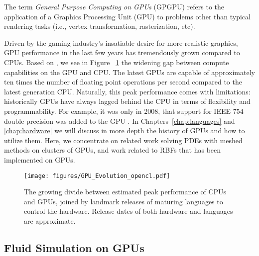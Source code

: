 
The term \emph{General Purpose Computing on GPUs} (GPGPU) refers to the application of a Graphics Processing Unit (GPU) 
to problems other than typical rendering tasks (i.e., vertex transformation, rasterization, etc). 

Driven by the gaming industry's insatiable desire for more realistic graphics, GPU performance in the last few years has 
tremendously grown compared to CPUs.
Based on \cite{Jansen:2007, CudaGuide:2008, GTX280:2008, Core2Extreme:2008, FermiPrice:2009}, we see in Figure~
\ref{fig:gpuevolution} the widening gap between compute capabilities on 
the GPU and CPU. The latest GPUs are capable of approximately ten times the number of 
floating point operations per second compared to the latest generation CPU. Naturally, this peak performance comes with limitations: historically GPUs have always lagged behind the CPU in terms 
of flexibility and programmability. For 
example, it was only in 2008, that support for IEEE 754 double precision was added to the GPU \cite{GTX280:2008}. In Chapters~\ref{chap:languages} and \ref{chap:hardware} we will discuss in more depth the history of GPUs and how to utilize them. Here, we concentrate on related work solving  PDEs with meshed methods on clusters of GPUs, and work related to RBFs that has been implemented on GPUs. 
\begin{figure}
      \centering
       \scalebox{0.50}
      { \texttt{[image: figures/GPU\_Evolution\_opencl.pdf]}
        \label{fig:gpuevolution}
      }
       \caption{The growing divide between estimated peak performance of CPUs and
        GPUs, joined by landmark releases of maturing languages to control the hardware. Release dates
         of both hardware and languages are approximate. }
\end{figure}

\subsection{Fluid Simulation on GPUs}


